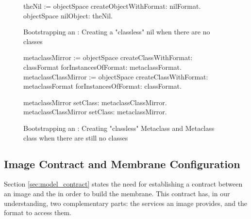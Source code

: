 \begin{figure}[htb]
\begin{code}
theNil := objectSpace createObjectWithFormat: nilFormat.
objectSpace nilObject: theNil.
\end{code}
\caption{Bootstrapping an \objectspace: Creating a "classless" nil when there are no classes
\label{code:bootstrap_nil}}
\end{figure}

\begin{figure}[htb]
\begin{code}
metaclassMirror := objectSpace
    createClassWithFormat: classFormat
    forInstancesOfFormat: metaclassFormat.
metaclassClassMirror := objectSpace
    createClassWithFormat: metaclassFormat
    forInstancesOfFormat: classFormat.
 
metaclassMirror             setClass: metaclassClassMirror.
metaclassClassMirror    setClass: metaclassMirror.
\end{code}
\caption{Bootstrapping an \objectspace: Creating "classless" Metaclass and Metaclass class  when there are still no classes
\label{code:bootstrap_classes}}
\end{figure}

\subsection{Image Contract and Membrane Configuration}

Section \ref{sec:model_contract} states the need for establishing a contract between an image and the \objectspace in order to build the \objectspace membrane. This contract has, in our understanding, two complementary parts: the services an image provides, and the format to access them.

